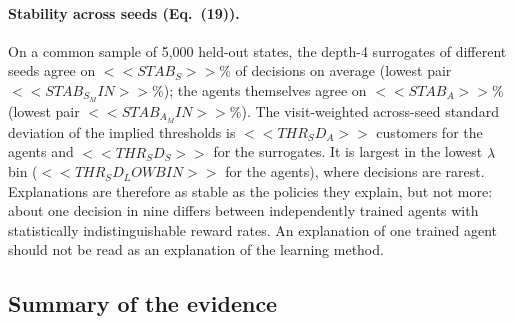\begin{table}[t]
\centering\small
\caption{Patch test and explanation-guided retraining per seed (12 paired replications of 10{,}000 time units). Gap: $g_{\rm ref}-g_{\rm agent}$. Flagged cells and their share of decisions. Gains are paired differences to the unpatched agent (mean $\pm$ 95\% half-width); ``recovered'' is patch gain over gap.}\label{tab:patch}
\end{table}

\paragraph{Stability across seeds (Eq.~(19)).} On a common sample of 5{,}000 held-out states, the depth-4 surrogates of different seeds agree on $<<STAB_S>>$\% of decisions on average (lowest pair $<<STAB_S_MIN>>$\%); the agents themselves agree on $<<STAB_A>>$\% (lowest pair $<<STAB_A_MIN>>$\%). The visit-weighted across-seed standard deviation of the implied thresholds is $<<THR_SD_A>>$ customers for the agents and $<<THR_SD_S>>$ for the surrogates. It is largest in the lowest $\hat\lambda$ bin ($<<THR_SD_LOWBIN>>$ for the agents), where decisions are rarest. Explanations are therefore as stable as the policies they explain, but not more: about one decision in nine differs between independently trained agents with statistically indistinguishable reward rates. An explanation of one trained agent should not be read as an explanation of the learning method.

\subsection{Summary of the evidence}\label{sec:num-summary}

